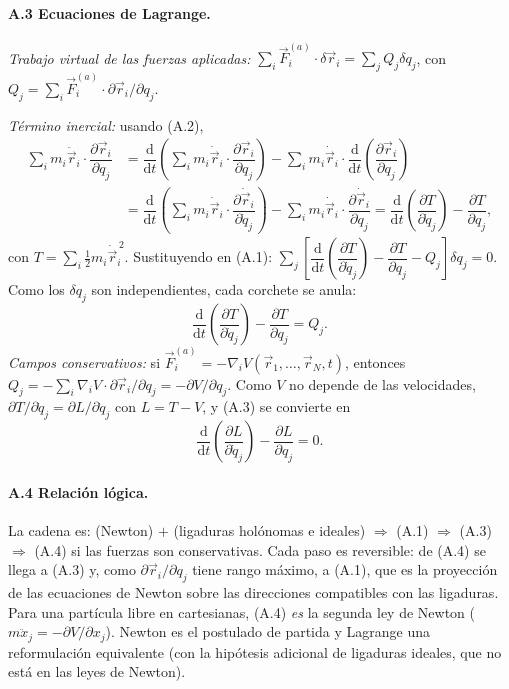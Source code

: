 \documentclass[11pt,a4paper]{article}
\newcommand{\dd}{\mathrm{d}}
\newcommand{\pd}[2]{\dfrac{\partial #1}{\partial #2}}
\newcommand{\ddt}[1]{\dfrac{\dd #1}{\dd t}}
\begin{document}
\paragraph{A.3 Ecuaciones de Lagrange.}
\emph{Trabajo virtual de las fuerzas aplicadas:} $\sum_i\vec F_i^{(a)}\cdot\delta\vec r_i=\sum_jQ_j\delta q_j$, con $Q_j=\sum_i\vec F_i^{(a)}\cdot\partial\vec r_i/\partial q_j$.

\emph{Término inercial:} usando (A.2),
\begin{align}
 \sum_im_i\ddot{\vec r}_i\cdot\pd{\vec r_i}{q_j}
 &=\ddt{}\!\left(\sum_im_i\dot{\vec r}_i\cdot\pd{\vec r_i}{q_j}\right)-\sum_im_i\dot{\vec r}_i\cdot\ddt{}\!\left(\pd{\vec r_i}{q_j}\right)\nonumber\\
 &=\ddt{}\!\left(\sum_im_i\dot{\vec r}_i\cdot\pd{\dot{\vec r}_i}{\dot q_j}\right)-\sum_im_i\dot{\vec r}_i\cdot\pd{\dot{\vec r}_i}{q_j}
 =\ddt{}\!\left(\pd{T}{\dot q_j}\right)-\pd{T}{q_j},
\end{align}
con $T=\sum_i\tfrac12m_i\dot{\vec r}_i^{\,2}$. Sustituyendo en (A.1):
$\sum_j\left[\ddt{}\!\left(\pd{T}{\dot q_j}\right)-\pd{T}{q_j}-Q_j\right]\delta q_j=0$. Como los $\delta q_j$ son independientes, cada corchete se anula:
\begin{equation}
 \ddt{}\!\left(\pd{T}{\dot q_j}\right)-\pd{T}{q_j}=Q_j .\tag{A.3}
\end{equation}
\emph{Campos conservativos:} si $\vec F_i^{(a)}=-\nabla_iV(\vec r_1,\ldots,\vec r_N,t)$, entonces $Q_j=-\sum_i\nabla_iV\cdot\partial\vec r_i/\partial q_j=-\partial V/\partial q_j$. Como $V$ no depende de las
velocidades, $\partial T/\partial\dot q_j=\partial L/\partial\dot q_j$ con $L=T-V$, y (A.3) se convierte en
\begin{equation}
 \ddt{}\!\left(\pd{L}{\dot q_j}\right)-\pd{L}{q_j}=0 .\tag{A.4}
\end{equation}

\paragraph{A.4 Relación lógica.}
La cadena es: (Newton) $+$ (ligaduras holónomas e ideales) $\Rightarrow$ (A.1) $\Rightarrow$ (A.3) $\Rightarrow$ (A.4) si las fuerzas son conservativas.
Cada paso es reversible: de (A.4) se llega a (A.3) y, como $\partial\vec r_i/\partial q_j$ tiene rango máximo, a (A.1), que es la proyección de las ecuaciones de Newton sobre las direcciones compatibles con las ligaduras.
Para una partícula libre en cartesianas, (A.4) \emph{es} la segunda ley de Newton ($m\ddot x_j=-\partial V/\partial x_j$). Newton es el postulado de partida y Lagrange una reformulación equivalente
(con la hipótesis adicional de ligaduras ideales, que no está en las leyes de Newton).
\end{document}

